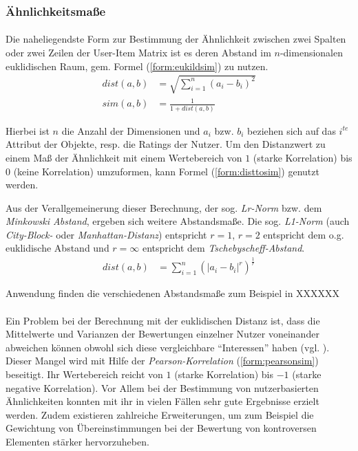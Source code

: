\subsubsection{Ähnlichkeitsmaße}
\label{sec:similarities}

\paragraph{} Die naheliegendste Form zur Bestimmung der Ähnlichkeit zwischen zwei Spalten oder zwei Zeilen der User-Item Matrix ist es deren Abstand im $n$-dimensionalen euklidischen Raum, gem. Formel (\ref{form:eukildsim}) zu nutzen.
\begin{align}
\label{form:eukildsim}
dist(a,b) & = \sqrt{\sum_{i=1}^{n} (a_i - b_i)^2} \\
sim(a,b) & = \frac{1}{1+dist(a,b)} \label{form:disttosim}
\end{align}

Hierbei ist $n$ die Anzahl der Dimensionen und $a_i$ bzw. $b_i$ beziehen sich auf das  $i^{te}$ Attribut der Objekte, resp. die Ratings der Nutzer. Um den Distanzwert zu einem Maß der Ähnlichkeit mit einem Wertebereich von $1$ (starke Korrelation) bis $0$ (keine Korrelation) umzuformen, kann Formel (\ref{form:disttosim}) genutzt werden.

Aus der Verallgemeinerung dieser Berechnung, der sog. \textit{Lr-Norm} bzw. dem \textit{Minkowski Abstand}, ergeben sich weitere Abstandsmaße. Die sog. \textit{L1-Norm} (auch \textit{City-Block-} oder \textit{Manhattan-Distanz}) entspricht $r=1$, $r=2$ entspricht dem o.g. euklidische Abstand und $ r=\infty $ entspricht dem \textit{Tschebyscheff-Abstand}. \citep{hb_02}
\begin{align}
\label{form:minkowskisim}
dist(a,b) & = \sum_{i=1}^{n} (\left| a_i - b_i \right|^r)^\frac{1}{r}
\end{align}

Anwendung finden die verschiedenen Abstandsmaße zum Beispiel in XXXXXX 

\paragraph{} Ein Problem bei der Berechnung mit der euklidischen Distanz ist, dass die Mittelwerte und Varianzen der Bewertungen einzelner Nutzer voneinander abweichen können obwohl sich diese vergleichbare ``Interessen'' haben (vgl. \citep[Kap. 2]{pci}). Dieser Mangel wird mit Hilfe der \textit{Pearson-Korrelation} (\ref{form:pearsonsim}) beseitigt.  Ihr Wertebereich reicht von $1$ (starke Korrelation) bis $-1$ (starke negative Korrelation). Vor Allem bei der Bestimmung von nutzerbasierten Ähnlichkeiten konnten mit ihr in vielen Fällen sehr gute Ergebnisse erzielt werden. Zudem existieren zahlreiche Erweiterungen, um zum Beispiel die Gewichtung von Übereinstimmungen bei der Bewertung von kontroversen Elementen stärker hervorzuheben. \citep[Kap. 2.1]{rs} \citep{hb_02}

